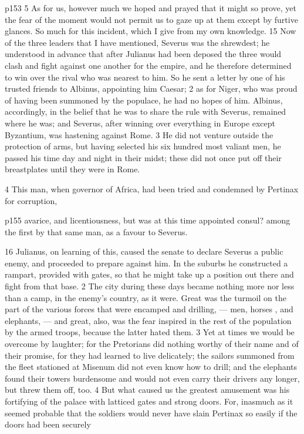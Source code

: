 p153 5 As for us, however much we hoped and prayed that it might so prove, yet the fear of the moment would not permit us to gaze up at them except by furtive glances. So much for this incident, which I give from my own knowledge.
15
Now of the three leaders that I have mentioned, Severus was the shrewdest; he understood in advance that after Julianus had been deposed the three would clash and fight against one another for the empire, and he therefore determined to win over the rival who was nearest to him. So he sent a letter by one of his trusted friends to Albinus, appointing him Caesar; 2 as for Niger, who was proud of having been summoned by the populace, he had no hopes of him. Albinus, accordingly, in the belief that he was to share the rule with Severus, remained where he was; and Severus, after winning over everything in Europe except Byzantium, was hastening against Rome. 3 He did not venture outside the protection of arms, but having selected his six hundred most valiant men, he passed his time day and night in their midst; these did not once put off their breastplates until they were in Rome.

4
This man, when governor of Africa, had been tried and condemned by Pertinax for corruption,

p155 avarice, and licentiousness, but was at this time appointed consul? among the first by that same man, as a favour to Severus.

16
Julianus, on learning of this, caused the senate to declare Severus a public enemy, and proceeded to prepare against him. In the suburbs he constructed a rampart, provided with gates, so that he might take up a position out there and fight from that base. 2 The city during these days became nothing more nor less than a camp, in the enemy's country, as it were. Great was the turmoil on the part of the various forces that were encamped and drilling, \texthebrew{—} men, horses , and elephants, \texthebrew{—} and great, also, was the fear inspired in the rest of the population by the armed troops, because the latter hated them. 3 Yet at times we would be overcome by laughter; for the Pretorians did nothing worthy of their name and of their promise, for they had learned to live delicately; the sailors summoned from the fleet stationed at Misenum did not even know how to drill; and the elephants found their towers burdensome and would not even carry their drivers any longer, but threw them off, too. 4 But what caused us the greatest amusement was his fortifying of the palace with latticed gates and strong doors. For, inasmuch as it seemed probable that the soldiers would never have slain Pertinax so easily if the doors had been securely

